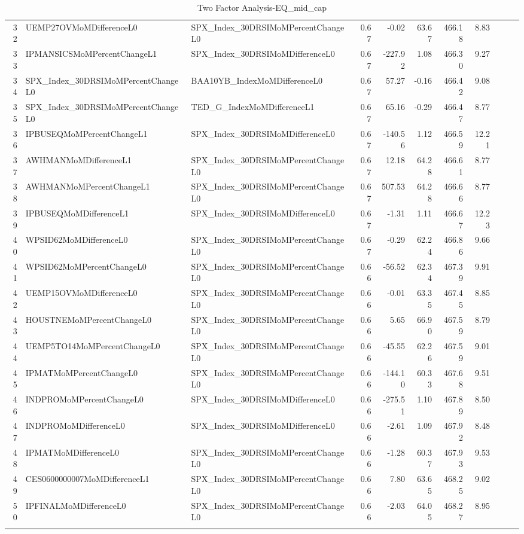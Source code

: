 \begin{longtable}{rllrrrrrlll}
  32 & UEMP27OVMoMDifferenceL0 & SPX\_Index\_30DRSIMoMPercentChangeL0 & 0.67 & -0.02 & 63.67 & 466.18 & 8.83 &  &  &  \\ 
  33 & IPMANSICSMoMPercentChangeL1 & SPX\_Index\_30DRSIMoMDifferenceL0 & 0.67 & -227.92 & 1.08 & 466.30 & 9.27 &  &  &  \\ 
  34 & SPX\_Index\_30DRSIMoMPercentChangeL0 & BAA10YB\_IndexMoMDifferenceL0 & 0.67 & 57.27 & -0.16 & 466.42 & 9.08 &  &  &  \\ 
  35 & SPX\_Index\_30DRSIMoMPercentChangeL0 & TED\_G\_IndexMoMDifferenceL1 & 0.67 & 65.16 & -0.29 & 466.47 & 8.77 &  &  &  \\ 
  36 & IPBUSEQMoMPercentChangeL1 & SPX\_Index\_30DRSIMoMDifferenceL0 & 0.67 & -140.56 & 1.12 & 466.59 & 12.21 &  &  &  \\ 
  37 & AWHMANMoMDifferenceL1 & SPX\_Index\_30DRSIMoMPercentChangeL0 & 0.67 & 12.18 & 64.28 & 466.61 & 8.77 &  &  &  \\ 
  38 & AWHMANMoMPercentChangeL1 & SPX\_Index\_30DRSIMoMPercentChangeL0 & 0.67 & 507.53 & 64.28 & 466.66 & 8.77 &  &  &  \\ 
  39 & IPBUSEQMoMDifferenceL1 & SPX\_Index\_30DRSIMoMDifferenceL0 & 0.67 & -1.31 & 1.11 & 466.67 & 12.23 &  &  &  \\ 
  40 & WPSID62MoMDifferenceL0 & SPX\_Index\_30DRSIMoMPercentChangeL0 & 0.67 & -0.29 & 62.24 & 466.86 & 9.66 &  &  &  \\ 
  41 & WPSID62MoMPercentChangeL0 & SPX\_Index\_30DRSIMoMPercentChangeL0 & 0.66 & -56.52 & 62.34 & 467.39 & 9.91 &  &  &  \\ 
  42 & UEMP15OVMoMDifferenceL0 & SPX\_Index\_30DRSIMoMPercentChangeL0 & 0.66 & -0.01 & 63.35 & 467.45 & 8.85 &  &  &  \\ 
  43 & HOUSTNEMoMPercentChangeL0 & SPX\_Index\_30DRSIMoMPercentChangeL0 & 0.66 & 5.65 & 66.90 & 467.59 & 8.79 &  &  &  \\ 
  44 & UEMP5TO14MoMPercentChangeL0 & SPX\_Index\_30DRSIMoMPercentChangeL0 & 0.66 & -45.55 & 62.26 & 467.59 & 9.01 &  &  &  \\ 
  45 & IPMATMoMPercentChangeL0 & SPX\_Index\_30DRSIMoMPercentChangeL0 & 0.66 & -144.10 & 60.33 & 467.68 & 9.51 &  &  &  \\ 
  46 & INDPROMoMPercentChangeL0 & SPX\_Index\_30DRSIMoMDifferenceL0 & 0.66 & -275.51 & 1.10 & 467.89 & 8.50 &  &  &  \\ 
  47 & INDPROMoMDifferenceL0 & SPX\_Index\_30DRSIMoMDifferenceL0 & 0.66 & -2.61 & 1.09 & 467.92 & 8.48 &  &  &  \\ 
  48 & IPMATMoMDifferenceL0 & SPX\_Index\_30DRSIMoMPercentChangeL0 & 0.66 & -1.28 & 60.37 & 467.93 & 9.53 &  &  &  \\ 
  49 & CES0600000007MoMDifferenceL1 & SPX\_Index\_30DRSIMoMPercentChangeL0 & 0.66 & 7.80 & 63.65 & 468.25 & 9.02 &  &  &  \\ 
  50 & IPFINALMoMDifferenceL0 & SPX\_Index\_30DRSIMoMPercentChangeL0 & 0.66 & -2.03 & 64.05 & 468.27 & 8.95 &  &  &  \\ 
   \hline
\hline
\caption{Two Factor Analysis-EQ_mid_cap} 
\end{longtable}
